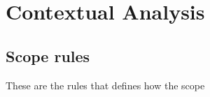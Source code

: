 \section{Contextual Analysis}

	\subsection{Scope rules}
	These are the rules that defines how the scope 	
	
	
	
